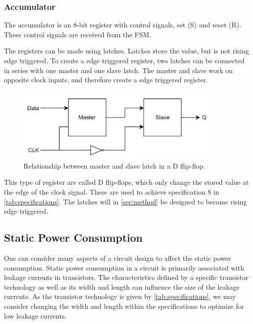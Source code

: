 \subsubsection{Accumulator}
The accumulator is an 8-bit register with control signals, set (S) and reset (R). These control signals are received from the FSM. 

The registers can be made using latches. Latches store the value, but is not rising edge triggered. To create a edge triggered register, two latches can be connected in series with one master and one slave latch. The master and slave work on opposite clock inputs, and therefore create a edge triggered register. 

\begin{figure}[H]
    \centering
    \includegraphics[width=0.9\textwidth]{Figures/DFF_Block.png}
    \caption{Relationship between master and slave latch in a D flip-flop.}
    \label{fig:enter-label}
\end{figure}

This type of register are called D flip-flops, which only change the stored value at the edge of the clock signal. These are used to achieve specification 8 in \autoref{tab:specifications}. The latches will in \autoref{sec:method} be designed to become rising edge triggered.



\subsection{Static Power Consumption}
\label{subsec:low_power}

One can consider many aspects of a circuit design to affect the static power consumption. Static power consumption in a circuit is primarily associated with leakage currents in transistors. The characteristics defined by a specific transistor technology as well as its width and length can influence the size of the leakage currents. As the transistor technology is given by \autoref{tab:specifications}, we may consider changing the width and length within the specifications to optimize for low leakage currents. 

